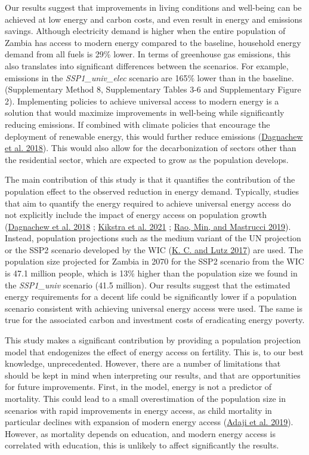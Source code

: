\documentclass[
]{article}
\begin{document}
Our results suggest that improvements in living conditions and well-being can be achieved at low energy and carbon costs, and even result in energy and emissions savings. Although electricity demand is higher when the entire population of Zambia has access to modern energy compared to the baseline, household energy demand from all fuels is 29\% lower. In terms of greenhouse gas emissions, this also translates into significant differences between the scenarios. For example, emissions in the \emph{SSP1\_univ\_elec} scenario are 165\% lower than in the baseline. (Supplementary Method 8, Supplementary Tables 3-6 and Supplementary Figure 2). Implementing policies to achieve universal access to modern energy is a solution that would maximize improvements in well-being while significantly reducing emissions. If combined with climate policies that encourage the deployment of renewable energy, this would further reduce emissions (\protect\hyperlink{ref-dagnachew_trade-offs_2018}{Dagnachew et al. 2018}). This would also allow for the decarbonization of sectors other than the residential sector, which are expected to grow as the population develops.

The main contribution of this study is that it quantifies the contribution of the population effect to the observed reduction in energy demand. Typically, studies that aim to quantify the energy required to achieve universal energy access do not explicitly include the impact of energy access on population growth (\protect\hyperlink{ref-dagnachew_trade-offs_2018}{Dagnachew et al. 2018} ; \protect\hyperlink{ref-kikstra_decent_2021}{Kikstra et al. 2021} ; \protect\hyperlink{ref-rao_energy_2019}{Rao, Min, and Mastrucci 2019}). Instead, population projections such as the medium variant of the UN projection or the SSP2 scenario developed by the WIC (\protect\hyperlink{ref-kc_human_2017}{K. C. and Lutz 2017}) are used. The population size projected for Zambia in 2070 for the SSP2 scenario from the WIC is 47.1 million people, which is 13\% higher than the population size we found in the \emph{SSP1\_univ} scenario (41.5 million). Our results suggest that the estimated energy requirements for a decent life could be significantly lower if a population scenario consistent with achieving universal energy access were used. The same is true for the associated carbon and investment costs of eradicating energy poverty.

This study makes a significant contribution by providing a population projection model that endogenizes the effect of energy access on fertility. This is, to our best knowledge, unprecedented. However, there are a number of limitations that should be kept in mind when interpreting our results, and that are opportunities for future improvements. First, in the model, energy is not a predictor of mortality. This could lead to a small overestimation of the population size in scenarios with rapid improvements in energy access, as child mortality in particular declines with expansion of modern energy access (\protect\hyperlink{ref-adaji_understanding_2019}{Adaji et al. 2019}). However, as mortality depends on education, and modern energy access is correlated with education, this is unlikely to affect significantly the results.
\end{document}
